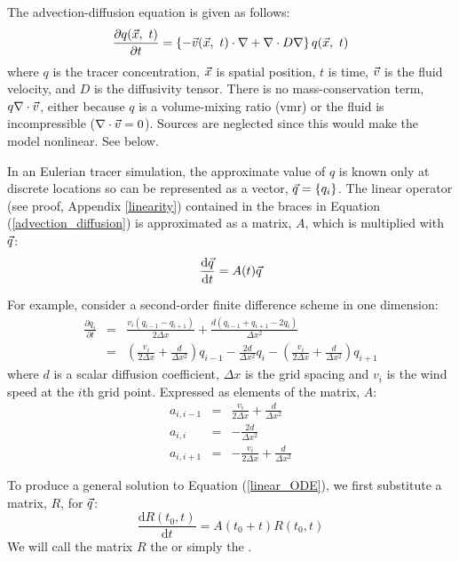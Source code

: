 The advection-diffusion equation is given as follows:
\begin{equation}
\frac{\partial q(\vec x, ~ t)}{\partial t} = \left \lbrace -\vec v(\vec x, ~t) \cdot \nabla + \nabla \cdot D \nabla \right \rbrace q(\vec x, ~ t)
\label{advection_diffusion}
\end{equation}
where $q$ is the tracer concentration, $\vec x$ is spatial position, 
$t$ is time, $\vec v$ is the fluid velocity, and $D$ is the diffusivity tensor.
There is no mass-conservation term, $q \nabla \cdot \vec v$,
either because $q$ is a volume-mixing ratio (vmr) or 
the fluid is incompressible ($\nabla \cdot \vec v = 0$).
Sources are neglected since this would make the model nonlinear.
See below.

In an Eulerian tracer simulation, the approximate value of $q$
is known only at discrete locations so can be represented as a vector,
$\vec q=\lbrace q_i \rbrace$.
The linear operator (see proof, Appendix \ref{linearity}) contained in the braces in Equation 
(\ref{advection_diffusion}) is approximated as a matrix, $A$, which is 
multiplied with $\vec q$:
\begin{equation}
\frac{\mathrm d \vec q}{\mathrm d t} = A(t) \vec q
\label{linear_ODE}
\end{equation}

For example, consider a second-order finite difference scheme in one dimension:
\begin{eqnarray}
\frac{\partial q_i}{\partial t} & = & \frac{v_i (q_{i-1} - q_{i+1})}{2 \Delta x} +
	\frac{d (q_{i-1} + q_{i+1} - 2 q_i)}{\Delta x^2} 
	\label{finite_difference_diffusion}
	\\\nonumber
& = & \left (\frac{v_i}{2 \Delta x} + \frac{d}{\Delta x^2} \right ) q_{i-1} -
	\frac{2 d}{\Delta x^2} q_i 
	- \left (\frac{v_i}{2 \Delta x} + \frac{d}{\Delta x^2} \right ) q_{i+1} 
\end{eqnarray}
where $d$ is a scalar diffusion coefficient, $\Delta x$ is the grid spacing
and $v_i$ is the wind speed at the $i$th grid point.
Expressed as elements of the matrix, $A$:
\begin{eqnarray}
a_{i,i-1} & = & \frac{v_i}{2 \Delta x} + \frac{d}{\Delta x^2} \\\nonumber
	a_{i,i} & = & -\frac{2 d}{\Delta x^2} \\\nonumber
a_{i,i+1} & = & - \frac{v_i}{2 \Delta x} + \frac{d}{\Delta x^2}
\end{eqnarray}

To produce a general solution to Equation (\ref{linear_ODE}), 
we first substitute a matrix, $R$, for $\vec q$:
\begin{equation}
	\frac{\mathrm d R(t_0, t)}{\mathrm d t} = A(t_0+t) R(t_0, t)
\end{equation}
We will call the matrix $R$ the  or simply
the .


